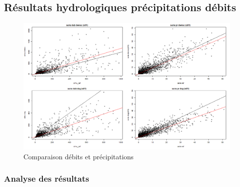\documentclass{beamer}
\numberwithin{equation}{section}
\begin{document}
	\subsection{Résultats hydrologiques précipitations débits}
	\begin{frame}
	\begin{figure}
		\begin{center}
			\includegraphics[scale=0.2]{images/multi_comparaison_5.png}
		\end{center}
	\caption{Comparaison débits et précipitations}
	\end{figure}
	\end{frame}

	\subsubsection{Analyse des résultats}
	
\end{document}
